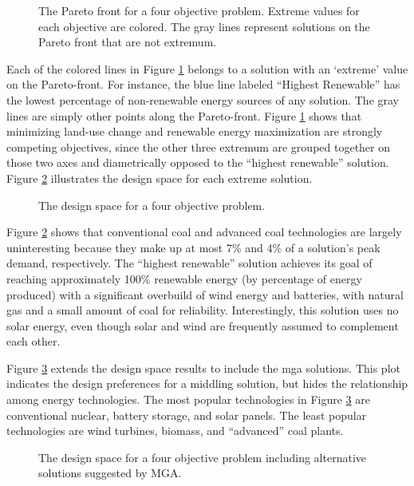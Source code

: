 \begin{figure}[h]
  \centering
  \resizebox{\columnwidth}{!}{}
  \caption{The Pareto front for a four objective problem. Extreme values for
  each objective are colored. The gray lines represent solutions on the Pareto
  front that are not extremum.}
  \label{fig:4-obj-pareto}
\end{figure}

Each of the colored lines in Figure \ref{fig:4-obj-pareto} belongs to a solution
with an `extreme' value on the Pareto-front. For instance, the blue line labeled
``Highest Renewable'' has the lowest percentage of non-renewable energy sources
of any solution. The gray lines are simply other points along the Pareto-front.
Figure \ref{fig:4-obj-pareto} shows that minimizing land-use change and
renewable energy maximization are strongly competing objectives, since the other
three extremum are grouped together on those two axes and diametrically opposed
to the ``highest renewable'' solution. Figure \ref{fig:4-obj-design} illustrates
the design space for each extreme solution. 


\begin{figure}[h]
  \centering
  \resizebox{\columnwidth}{!}{}
  \caption{The design space for a four objective problem.}
  \label{fig:4-obj-design}
\end{figure}

Figure \ref{fig:4-obj-design} shows that conventional coal and advanced coal
technologies are largely uninteresting because they make up at most 7\% and 4\%
of a solution's peak demand, respectively. The ``highest renewable'' solution
achieves its goal of reaching approximately 100\% renewable energy (by
percentage of energy produced) with a significant overbuild of wind energy and
batteries, with natural gas and a small amount of coal for reliability.
Interestingly, this solution uses no solar energy, even though solar and wind
are frequently assumed to complement each other.

Figure \ref{fig:4-obj-design-mga} extends the design space results to include
the \ac{mga} solutions. This plot indicates the design preferences for a
middling solution, but hides the relationship among energy technologies. The
most popular technologies in Figure \ref{fig:4-obj-design-mga} are conventional
nuclear, battery storage, and solar panels. The least popular technologies are
wind turbines, biomass, and ``advanced'' coal plants.

\begin{figure}[h]
  \centering
  \resizebox{\columnwidth}{!}{}
  \caption{The design space for a four objective problem including alternative solutions suggested by MGA.}
  \label{fig:4-obj-design-mga}
\end{figure}